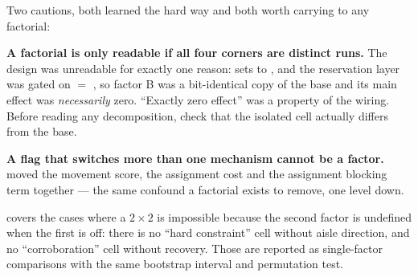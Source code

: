 \begin{caveat}
Two cautions, both learned the hard way and both worth carrying to any
factorial:

\textbf{A factorial is only readable if all four corners are distinct runs.}
The  design was unreadable for exactly
one reason:  sets  to
, and the reservation layer was gated on
 $=$ , so factor B was a bit-identical
copy of the base and its main effect was \emph{necessarily} zero. ``Exactly
zero effect'' was a property of the wiring. Before reading any decomposition,
check that the isolated cell actually differs from the base.

\textbf{A flag that switches more than one mechanism cannot be a factor.}
 moved the movement score, the assignment cost and the
assignment blocking term together --- the same confound a factorial exists to
remove, one level down.
\end{caveat}

 covers the cases where a $2 \times 2$ is
impossible because the second factor is undefined when the first is off: there
is no ``hard constraint'' cell without aisle direction, and no ``corroboration''
cell without recovery. Those are reported as single-factor comparisons with the
same bootstrap interval and permutation test.
